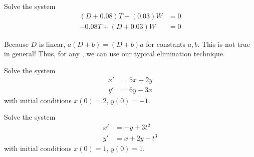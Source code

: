 \begin{applicationActivities}
\begin{activity}{15}
Solve the system
\begin{alignat*}{2}
(D+0.08)T-(0.03)W &= 0 \\
-0.08T + (D+0.03)W &= 0 
\end{alignat*}
\end{activity}

\begin{observation}
Because \(D\) is linear, \(a(D+b)=(D+b)a\) for constants \(a,b\).  This is not true in general!
\vfill
Thus, for any , we can use our typical elimination technique.
\end{observation}

\begin{activity}{15}
Solve the system
\begin{alignat*}{2}
x'&=5x-2y \\
y'&=6y-3x
\end{alignat*}
with initial conditions \(x(0)=2\), \(y(0)=-1\).
\end{activity}

\begin{activity}{15}
Solve the system
\begin{alignat*}{2}
x'&=-y+3t^2 \\
y'&=x+2y-t^3
\end{alignat*}
with initial conditions \(x(0)=1\), \(y(0)=1\).
\end{activity}


\end{applicationActivities}

